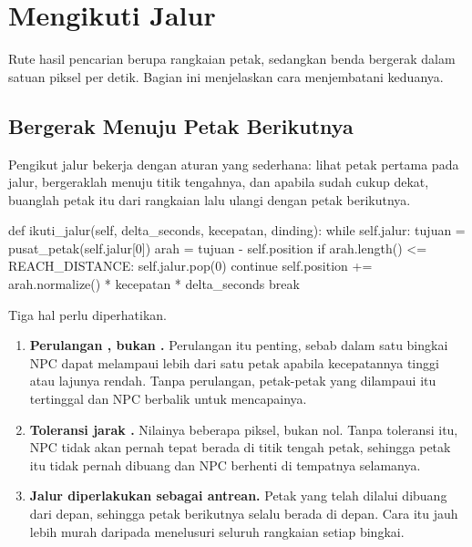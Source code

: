 \section{Mengikuti Jalur}
\label{sec:mengikuti-jalur}

Rute hasil pencarian berupa rangkaian petak, sedangkan benda bergerak dalam
satuan piksel per detik. Bagian ini menjelaskan cara menjembatani keduanya.

\subsection{Bergerak Menuju Petak Berikutnya}

Pengikut jalur bekerja dengan aturan yang sederhana: lihat petak pertama pada
jalur, bergeraklah menuju titik tengahnya, dan apabila sudah cukup dekat,
buanglah petak itu dari rangkaian lalu ulangi dengan petak berikutnya.

\begin{kodekeluaran}
def ikuti_jalur(self, delta_seconds, kecepatan, dinding):
    while self.jalur:
        tujuan = pusat_petak(self.jalur[0])
        arah = tujuan - self.position
        if arah.length() <= REACH_DISTANCE:
            self.jalur.pop(0)
            continue
        self.position += arah.normalize() * kecepatan * delta_seconds
        break
\end{kodekeluaran}

Tiga hal perlu diperhatikan.

\begin{enumerate}
  \item \textbf{Perulangan , bukan .} Perulangan itu
        penting, sebab dalam satu bingkai NPC dapat melampaui lebih dari satu
        petak apabila kecepatannya tinggi atau lajunya rendah. Tanpa perulangan,
        petak-petak yang dilampaui itu tertinggal dan NPC berbalik untuk
        mencapainya.
  \item \textbf{Toleransi jarak .} Nilainya beberapa
        piksel, bukan nol. Tanpa toleransi itu, NPC tidak akan pernah tepat
        berada di titik tengah petak, sehingga petak itu tidak pernah dibuang
        dan NPC berhenti di tempatnya selamanya.
  \item \textbf{Jalur diperlakukan sebagai antrean.} Petak yang telah dilalui
        dibuang dari depan, sehingga petak berikutnya selalu berada di depan.
        Cara itu jauh lebih murah daripada menelusuri seluruh rangkaian setiap
        bingkai.
\end{enumerate}

